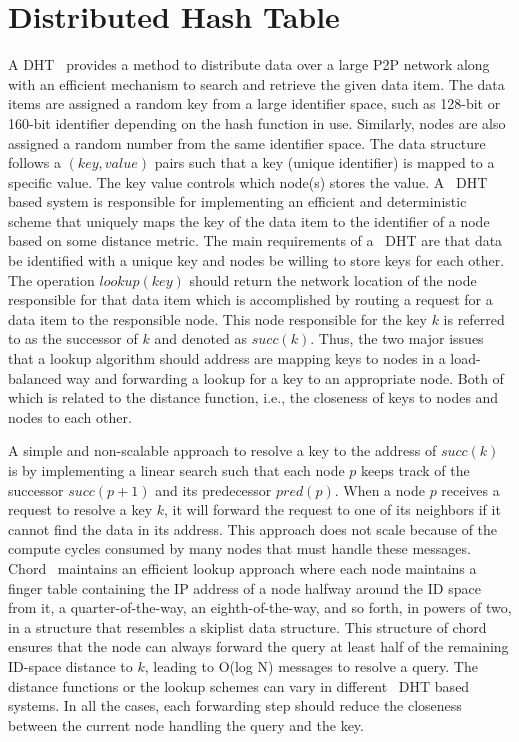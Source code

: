 \section{Distributed Hash Table} \label{DHT}
A \ac{DHT}~\cite{balakrishnan2003looking,tanenbaum2007distributed} provides a
method to distribute data over a large P2P network along with an efficient
mechanism to search and retrieve the given data item. The data items are
assigned a random key from a large identifier space, such as 128-bit or 160-bit
identifier depending on the hash function in use. Similarly, nodes are also
assigned a random number from the same identifier space. The data structure
follows a $(key, value)$ pairs such that a key (unique identifier) is mapped to
a specific value. The key value controls which node(s) stores the value. A
~\ac{DHT} based system is responsible for implementing an efficient and
deterministic scheme that uniquely maps the key of the data item to the
identifier of a node based on some distance metric. The main requirements of a
~\ac{DHT} are that data be identified with a unique key and nodes be willing to
store keys for each other. The operation $lookup(key)$ should return the
network location of the node responsible for that data item which is
accomplished by routing a request for a data item to the responsible node. This
node responsible for the key $k$ is referred to as the successor of $k$ and
denoted as $succ(k)$. Thus, the two major issues that a lookup algorithm should
address are mapping keys to nodes in a load-balanced way and forwarding a
lookup for a key to an appropriate node. Both of which is related to the
distance function, i.e., the closeness of keys to nodes and nodes to each
other.\par
A simple and non-scalable approach to resolve a key to the address of $succ(k)$
is by implementing a linear search such that each node $p$ keeps track of the
successor $succ(p+1)$ and its predecessor $pred(p)$. When a node $p$ receives a
request to resolve a key $k$, it will forward the request to one of its
neighbors if it cannot find the data in its address. This approach does not
scale because of the compute cycles consumed by many nodes that must handle
these messages. Chord~\cite{stoica2001chord,} maintains an efficient lookup
approach where each node maintains a finger table containing the IP address of
a node halfway around the ID space from it, a quarter-of-the-way, an
eighth-of-the-way, and so forth, in powers of two, in a structure that
resembles a skiplist data structure. This structure of chord ensures that the
node can always forward the query at least half of the remaining ID-space
distance to $k$, leading to O(log N) messages to resolve a query. The distance
functions or the lookup schemes can vary in different ~\ac{DHT} based systems.
In all the cases, each forwarding step should reduce the closeness between the
current node handling the query and the key.

